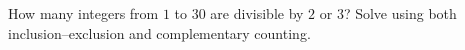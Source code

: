 How many integers from $1$ to $30$ are divisible by $2$ or $3$? Solve using both inclusion--exclusion and complementary counting.
